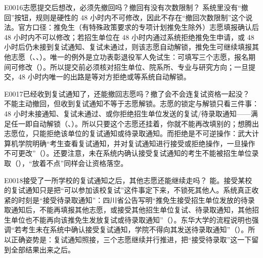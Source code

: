 \begin{qa}{E0016}{志愿提交后想改，必须先撤回吗？撤回有没有次数限制？}
系统里没有“撤回”按钮，规则是硬性的 48 小时内不可修改，因此不存在“撤回次数限制”这个说法。官方口径：推免生（有特殊政策要求的专项计划推免生除外）志愿填报确认后 48 小时内不可以修改；若招生单位在 48 小时内通过系统拒绝推免生申请，或 48 小时后仍未接到复试通知、复试未通过，则该志愿自动解锁，推免生可继续填报其他志愿（、、）。唯一的例外是立功表彰退役军人免试生：可填写三个志愿，报名期间可修改（）。所以提交前必须核对招生单位、院系所、专业与研究方向；一旦提交，48 小时内唯一的出路是等对方拒绝或等系统自动解锁。
\end{qa}

\begin{qa}{E0017}{已经收到复试通知了，还能撤回志愿吗？撤了会不会连复试资格一起没？}
不能主动撤回，但收到复试通知不等于志愿解锁。志愿的锁定与解锁只看三件事：48 小时未接通知、复试未通过、或你拒绝招生单位发送的复试/待录取通知——满足任一即自动解锁（、）。所以只要这个志愿还挂着，你就不能再改填别的；想腾出志愿位，只能拒绝该单位的复试通知或待录取通知。而拒绝是不可逆操作：武大计算机学院明确“考生查看复试通知，并对复试通知进行接受或拒绝操作，一旦操作不可更改”（）。还要注意，未在系统内确认接受复试通知的考生不能被招生单位录取（），“放着不点”同样会让资格落空。
\end{qa}

\begin{qa}{E0018}{接受了一所学校的复试通知之后，其他志愿还能继续走吗？}
能。接受某校的复试通知只是把“可以参加该校复试”这件事定下来，不锁死其他人。系统真正收紧的时刻是“接受待录取通知”：四川省公告写明“推免生接受招生单位发放的待录取通知后，不能再填报其他志愿，或接受其他招生单位复试、待录取通知，其他招生单位也不能再向该推免生发放复试或待录取通知”（）。东华大学的流程说明也强调“若考生未在系统中确认接受复试通知，学院不得向其发送待录取通知”（）。所以正确姿势是：复试通知照接，三个志愿继续并行推进，把“接受待录取”这一下留到全部结果出来之后。
\end{qa}

